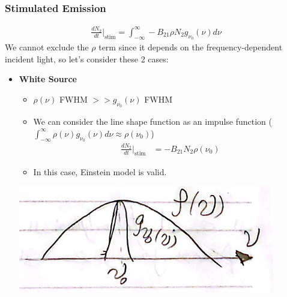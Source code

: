 \documentclass[11pt]{article}
\begin{document}
\subsubsection{Stimulated Emission}
\begin{align*}
    \frac{dN_2}{dt} \bigg|_{\text{stim}} = \int_{-\infty}^{\infty} -B_{21} \rho N_2 g_{\nu_0}(\nu) d\nu
\end{align*}
We cannot exclude the $\rho$ term since it depends on the frequency-dependent incident light, so let's consider these 2 cases:
\begin{itemize}
    \item \textbf{White Source} 
        \begin{itemize}
            \item $\rho(\nu)$ FWHM $>> g_{\nu_0}(\nu)$ FWHM
            \item We can consider the line shape function as an impulse function ($\int_{-\infty}^{\infty} \rho(\nu) g_{\nu_0}(\nu) d\nu \approx \rho(\nu_0)$)
            \begin{align*}
                \frac{dN_2}{dt} \bigg|_{\text{stim}} &= -B_{21} N_2 \rho(\nu_0)
            \end{align*}
            \item In this case, Einstein model is valid.
        \end{itemize}
        \begin{center}
            \includegraphics[scale=0.8]{5.png}
        \end{center}


\end{itemize}
\end{document}
